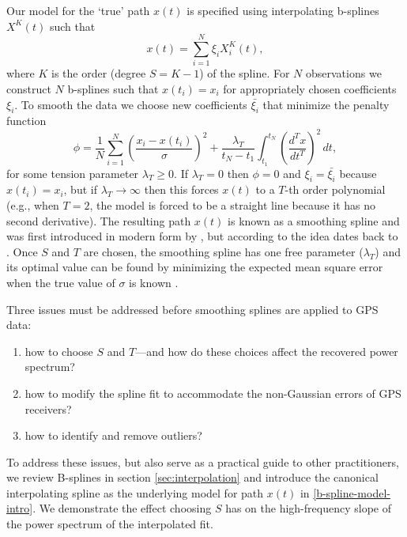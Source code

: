 \documentclass{ametsoc}
\begin{document}
Our model for the `true' path $x(t)$ is specified using interpolating b-splines $X^K(t)$ such that
\begin{equation}
\label{b-spline-model-intro}
    x(t) = \sum_{i=1}^N \xi_i X^K_i(t),
\end{equation}
where $K$ is the order (degree $S=K-1$) of the spline. For $N$ observations we construct $N$ b-splines such that $x(t_i)=x_i$ for appropriately chosen coefficients $\xi_i$. To smooth the data we choose new coefficients $\bar{\xi_i}$ that minimize the penalty function
\begin{equation}
\label{smoothing-spline}
\phi =  \frac{1}{N}\sum_{i=1}^{N} \left( \frac{x_i - x(t_i)}{\sigma} \right) ^2 + \frac{\lambda_T}{t_N-t_1} \int_{t_1}^{t_N} \left(\frac{d^T x}{dt^T}\right)^2 \, dt,
\end{equation}
for some tension parameter $\lambda_T \geq 0$. If $\lambda_T = 0$ then $\phi=0$ and $\xi_i=\bar{\xi_i}$ because $x(t_i)=x_i$, but if $\lambda_T \rightarrow \infty$ then this forces $x(t)$ to a $T$-th order polynomial (e.g., when $T=2$, the model is forced to be a straight line because it has no second derivative). The resulting path $x(t)$ is known as a smoothing spline and was first introduced in modern form by \citet{reinsch1967-nm}, but according to \citet{deboor1978-book} the idea dates back to \citet{whittaker1923-pems}. Once $S$ and $T$ are chosen, the smoothing spline has one free parameter ($\lambda_T$) and its optimal value can be found by minimizing the expected mean square error when the true value of $\sigma$ is known \citep{craven1979-nm}.

Three issues must be addressed before smoothing splines are applied to GPS data:
\begin{enumerate}
    \item how to choose $S$ and $T$---and how do these choices affect the recovered power spectrum?
    \item how to modify the spline fit to accommodate the non-Gaussian errors of GPS receivers?
    \item how to identify and remove outliers?
\end{enumerate}
To address these issues, but also serve as a practical guide to other practitioners, we review B-splines in section \ref{sec:interpolation} and introduce the canonical interpolating spline as the underlying model for path $x(t)$ in \eqref{b-spline-model-intro}. We demonstrate the effect choosing $S$ has on the high-frequency slope of the power spectrum of the interpolated fit.
\end{document}
